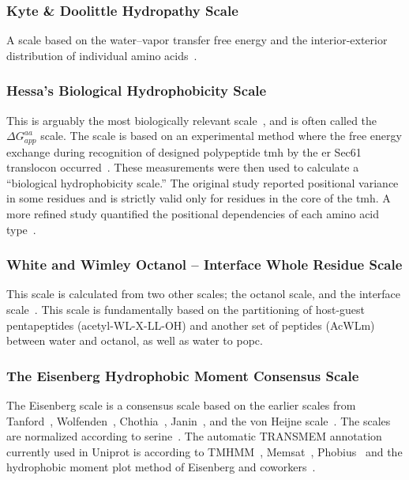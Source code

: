 
\subsubsection{Kyte \& Doolittle Hydropathy Scale}

A scale based on the water\---vapor transfer free energy and the interior-exterior distribution of individual amino acids~\cite{Kyte1982}.

\subsubsection{Hessa's Biological Hydrophobicity Scale}

This is arguably the most biologically relevant scale~\cite{Peters2014}, and is often called the ${\Delta G}_{app}^{aa}$ scale. The scale is based on an experimental method where the free energy exchange during recognition of designed polypeptide \gls{tmh} by the \gls{er} Sec61 translocon occurred~\cite{Hessa2005}. These measurements were then used to calculate a “biological hydrophobicity scale.” The original study reported positional variance in some residues and is strictly valid only for residues in the core of the \gls{tmh}. A more refined study quantified the positional dependencies of each amino acid type~\cite{Hessa2007}.

\subsubsection{White and Wimley Octanol \--- Interface Whole Residue Scale}

This scale is calculated from two other scales; the octanol scale, and the interface scale~\cite{White1999}. This scale is fundamentally based on the partitioning of host-guest pentapeptides (acetyl-WL-X-LL-OH) and another set of peptides (AcWLm) between water and octanol, as well as water to \gls{popc}.

\subsubsection{The Eisenberg Hydrophobic Moment Consensus Scale}

The Eisenberg scale is a consensus scale based on the earlier scales from Tanford~\cite{Nozaki1971}, Wolfenden~\cite{Rose1993}, Chothia~\cite{Chothia1976}, Janin~\cite{Janin1979}, and the von Heijne scale~\cite{VonHeijne1979}. The scales are normalized according to serine~\cite{Eisenberg1984}. The automatic TRANSMEM annotation currently used in Uniprot is according to TMHMM~\cite{Krogh2001}, Memsat~\cite{Jones2007}, Phobius~\cite{Kall2004} and the hydrophobic moment plot method of Eisenberg and coworkers~\cite{Eisenberg1984}.



